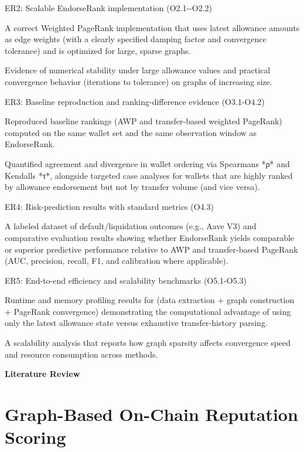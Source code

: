 \documentclass[
]{article}
\begin{document}
ER2: Scalable EndorseRank implementation (O2.1-\/-O2.2)

A correct Weighted PageRank implementation that uses latest allowance amounts as edge weights (with a clearly specified damping factor and convergence tolerance) and is optimized for large, sparse graphs.

Evidence of numerical stability under large allowance values and practical convergence behavior (iterations to tolerance) on graphs of increasing size.

ER3: Baseline reproduction and ranking-difference evidence (O3.1-O4.2)

Reproduced baseline rankings (AWP and transfer-based weighted PageRank) computed on the same wallet set and the same observation window as EndorseRank.

Quantified agreement and divergence in wallet ordering via Spearman\textquotesingle s *ρ* and Kendall\textquotesingle s *τ*, alongside targeted case analyses for wallets that are highly ranked by allowance endorsement but not by transfer volume (and vice versa).

ER4: Risk-prediction results with standard metrics (O4.3)

A labeled dataset of default/liquidation outcomes (e.g., Aave V3) and comparative evaluation results showing whether EndorseRank yields comparable or superior predictive performance relative to AWP and transfer-based PageRank (AUC, precision, recall, F1, and calibration where applicable).

ER5: End-to-end efficiency and scalability benchmarks (O5.1-O5.3)

Runtime and memory profiling results for (data extraction + graph construction + PageRank convergence) demonstrating the computational advantage of using only the latest allowance state versus exhaustive transfer-history parsing.

A scalability analysis that reports how graph sparsity affects convergence speed and resource consumption across methods.

\protect{}\label{wm8uvozi6slm}{}\textbf{Literature Review}

\section{Graph-Based On-Chain Reputation Scoring}\label{graph-based-on-chain-reputation-scoring}
\end{document}
